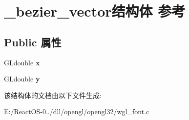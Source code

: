 \hypertarget{struct__bezier__vector}{}\section{\+\_\+bezier\+\_\+vector结构体 参考}
\label{struct__bezier__vector}
\subsection*{Public 属性}
\begin{DoxyCompactItemize}
\item 
\mbox{\label{struct__bezier__vector_adadec470ee083ab2b59e73305492869b}} 
G\+Ldouble {\bfseries x}
\item 
\mbox{\label{struct__bezier__vector_a7164296faabe46ebb2adb5b25ea76728}} 
G\+Ldouble {\bfseries y}
\end{DoxyCompactItemize}


该结构体的文档由以下文件生成\+:\begin{DoxyCompactItemize}
\item 
E\+:/\+React\+O\+S-\/0../dll/opengl/opengl32/wgl\+\_\+font.\+c\end{DoxyCompactItemize}
